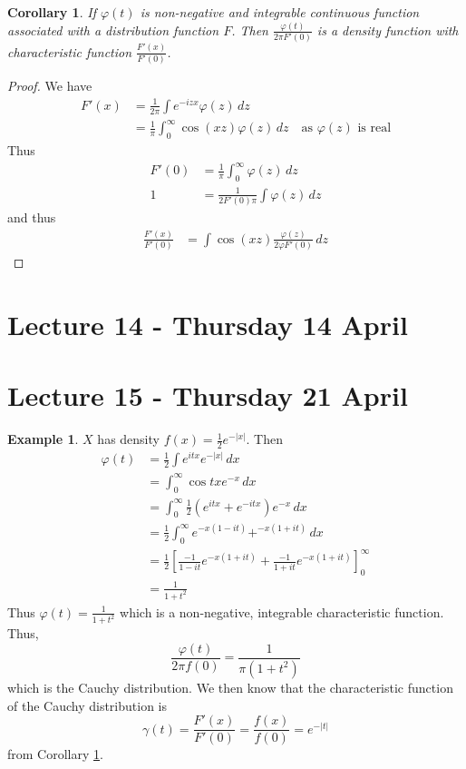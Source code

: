 \documentclass[10pt, oneside, reqno]{amsart}
\theoremstyle{plain}%
\newtheorem{cor}[thm]{Corollary}
\theoremstyle{definition}
\newtheorem{exmp}[thm]{Example}
\theoremstyle{remark}
\renewcommand{\phi}{\varphi}
\begin{document}
\begin{cor}\label{cor:duality}
    If $\phi(t)$ is non-negative and integrable continuous function associated with a distribution function $F$.  Then $\frac{\phi(t)}{2 \pi F'(0)}$ is a density function with characteristic function $\frac{F'(x)}{F'(0)}$.
\end{cor}

\begin{proof}
    We have \begin{align*}
        F'(x)   &= \frac{1}{2\pi} \int e^{-izx} \phi(z) \, dz \\
                &= \frac{1}{\pi} \int_0^\infty \cos(xz) \phi(z) \, dz \quad \text{as $\phi(z)$ is real}         \end{align*}
    Thus \begin{align*}
        F'(0)   &= \frac{1}{\pi} \int_0^\infty \phi(z) \, dz  \\
        1       &= \frac{1}{2 F'(0) \pi} \int \phi(z) \, dz 
    \end{align*}
    and thus 
    \begin{align*}
        \frac{F'(x)}{F'(0)} &= \int \cos(xz) \frac{\phi(z)}{2 \phi F'(0)} \, dz
    \end{align*}
\end{proof}
\section{Lecture 14 - Thursday 14 April} %
\label{sec:lecture_14_thursday_14_april}


\section{Lecture 15 - Thursday 21 April} %
\label{sec:lecture_15_thursday_21_april}
\begin{exmp}
    $X$ has density $f(x) = \frac{1}{2} e^{-|x|}$.  Then \begin{align*}
        \phi(t) &= \frac{1}{2} \int e^{itx} e^{-|x|} \, dx \\
        &= \int_0^\infty \cos tx e^{-x} \, dx \\
        &= \int_0^\infty \frac{1}{2} \left( e^{itx} + e^{-itx} \right) e^{-x} \, dx \\
        &= \frac{1}{2} \int_0^\infty e^{-x(1-it)} + ^{-x(1 +it)} \, dx \\
        &= \frac{1}{2} \left[ \frac{-1}{1-it}e^{-x(1+it)} + \frac{-1}{1+it}e^{-x(1+it)} \right]_0^\infty \\
        &= \frac{1}{1+t^2}
    \end{align*}  Thus $\phi(t) = \frac{1}{1+t^2}$ which is a non-negative, integrable characteristic function.  Thus, \[
        \frac{\phi(t)}{2\pi f(0)} = \frac{1}{\pi(1+t^2)} 
    \] which is the Cauchy distribution.  We then know that the characteristic function of the Cauchy distribution is \[
        \gamma(t) = \frac{F'(x)}{F'(0)} = \frac{f(x)}{f(0)} = e^{-|t|}
    \] from Corollary \ref{cor:duality}.
\end{exmp}
\end{document}

